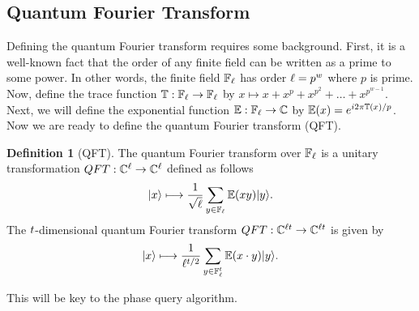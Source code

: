 \documentclass[12pt,twoside]{reedthesis}
\theoremstyle{definition}
\newtheorem{definition}[theorem]{Definition}
\newlength{\arrow}
\newcommand{\C}{\mathbb{C}}
\newcommand{\F}{\mathbb{F}}
\newcommand{\ket}[1]{\ensuremath{\lvert #1\rangle}\xspace}
\begin{document}
\subsection{Quantum Fourier Transform}
Defining the quantum Fourier transform requires some background. First, it is a well-known fact that the order of any finite field can be written as a prime to some power. In other words, the finite field $\F_\fsize$ has order $\ell = p^w$ where $p$ is prime. Now, define the trace function $\tracef: \F_\fsize \rightarrow \F_\fsize$ by $x \mapsto x + x^p + x^{p^2} + \ldots + x^{p^{w-1}}$. Next, we will define the exponential function $\expf: \F_\fsize \rightarrow \C$ by $\mathbb{E}(x) = e^{i2\pi \mathbb{T}(x)/p}$. Now we are ready to define the quantum Fourier transform (QFT).

\begin{definition}[QFT] The quantum Fourier transform over $\F_\fsize$ is a unitary transformation $QFT: \C^\fsize\rightarrow \C^\fsize$ defined as follows 
\begin{equation*}
\ket{x} \longmapsto \frac{1}{\sqrt{\fsize}} \sum_{y \in \F_\fsize} \expf(xy) \ket{y}.
\end{equation*}
The $t$-dimensional quantum Fourier transform $QFT: \C^{\fsize\numq}\rightarrow \C^{\fsize\numq}$ is given by
\begin{equation*}
\ket{x} \longmapsto \frac{1}{\fsize^{\numq/2}} \sum_{y\in \F_\fsize^\numq} \expf(x \cdot y) \ket{y}.
\end{equation*}
\end{definition}
This will be key to the phase query algorithm.
\end{document}
